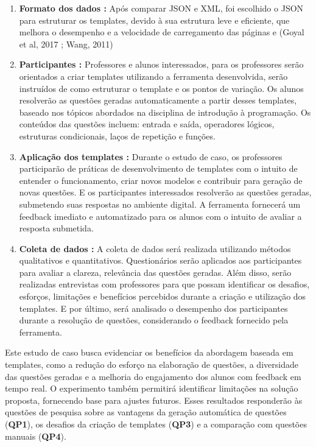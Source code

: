 \begin{enumerate}[label=\textbf{\alph*)}]
    \item \textbf{Formato dos dados :}  Após comparar JSON e XML, foi escolhido o JSON para estruturar os templates, devido à sua estrutura leve e eficiente, que melhora o desempenho e a velocidade de carregamento das páginas \parencite{goyal2017} e \parencite{wang2011} (Goyal et al, 2017 ; Wang, 2011)
    \item \textbf{Participantes :}  Professores e alunos interessados, para os professores serão orientados a criar templates utilizando a ferramenta desenvolvida, serão instruídos de como estruturar o template e os pontos de variação. Os alunos resolverão as questões geradas automaticamente a partir desses templates, baseado nos tópicos abordados na disciplina de introdução à programação. Os conteúdos das questões incluem: entrada e saída, operadores lógicos, estruturas condicionais, laços de repetição e funções. 
    \item \textbf{Aplicação dos templates :} Durante o estudo de caso, os professores participarão de práticas de desenvolvimento de templates com o intuito de entender o funcionamento, criar novos modelos e contribuir para geração de novas questões. E os participantes interessados resolverão as questões geradas, submetendo suas respostas no ambiente digital. A ferramenta fornecerá um feedback imediato e automatizado para os alunos com o intuito de avaliar a resposta submetida.
    \item \textbf{Coleta de dados  :} A coleta de dados será realizada utilizando métodos qualitativos e quantitativos. Questionários serão aplicados aos participantes para avaliar a clareza, relevância das questões geradas. Além disso, serão realizadas entrevistas com professores para que possam identificar os desafios, esforços, limitações e benefícios percebidos durante a criação e utilização dos templates. E por último, será analisado o desempenho dos participantes durante a resolução de questões, considerando o feedback fornecido pela ferramenta.

\end{enumerate}

Este estudo de caso busca evidenciar os benefícios da abordagem baseada em templates, como a redução do esforço na elaboração de questões, a diversidade das questões geradas e a melhoria do engajamento dos alunos com feedback em tempo real. O experimento também permitirá identificar limitações na solução proposta, fornecendo base para ajustes futuros. Esses resultados responderão às questões de pesquisa sobre as vantagens da geração automática de questões (\textbf{QP1}), os desafios da criação de templates (\textbf{QP3}) e a comparação com questões manuais (\textbf{QP4}).

